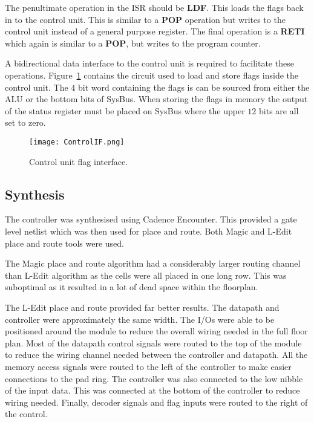 The penultimate operation in the ISR should be \textbf{LDF}. This loads the flags back in to the control unit.
This is similar to a \textbf{POP} operation but writes to the control unit instead of a general purpose register. 
The final operation is a \textbf{RETI} which again is similar to a \textbf{POP}, but writes to the program counter.

A bidirectional data interface to the control unit is required to facilitate these operations. 
Figure~\ref{fig:FlagCircuit} contains the circuit used to load and store flags inside the control unit.
The $4$ bit word containing the flags is can be sourced from either the ALU or the bottom bits of SysBus. 
When storing the flags in memory the output of the status register must be placed on SysBus where the upper $12$ bits are all set to zero.

\begin{figure}[ht]
   \centering
    \texttt{[image: ControlIF.png]}
		\caption{Control unit flag interface.}
		\label{fig:FlagCircuit}
\end{figure}





\subsection{Synthesis}

The controller was synthesised using Cadence Encounter. 
This provided a gate level netlist which was then used for place and route.
Both Magic and L-Edit place and route tools were used. 

The Magic place and route algorithm had a considerably larger routing channel than L-Edit algorithm as the cells were all placed in one long row. 
This was suboptimal as it resulted in a lot of dead space within the floorplan.

The L-Edit place and route provided far better results. 
The datapath and controller were approximately the same width. 
The I/Os were able to be positioned around the module to reduce the overall wiring needed in the full floor plan. 
Most of the datapath control signals were routed to the top of the module to reduce the wiring channel needed between the controller and datapath.
All the memory access signals were routed to the left of the controller to make easier connections to the pad ring. 
The controller was also connected to the low nibble of the input data. 
This was connected at the bottom of the controller to reduce wiring needed. 
Finally, decoder signals and flag inputs were routed to the right of the control. 


